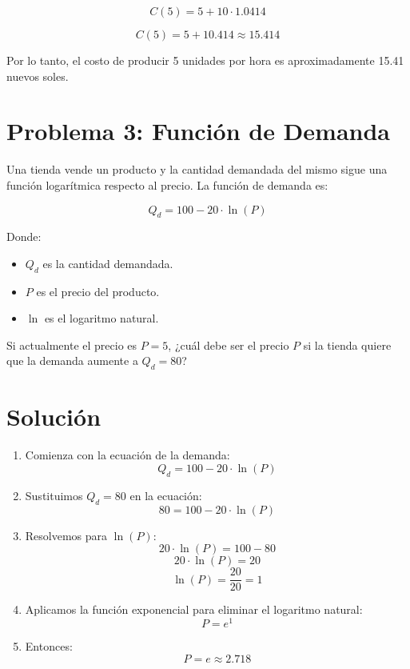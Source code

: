 \documentclass{article}
\begin{document}
\[
C(5) = 5 + 10 \cdot 1.0414
\]

\[
C(5) = 5 + 10.414 \approx 15.414
\]

Por lo tanto, el costo de producir 5 unidades por hora es aproximadamente 15.41 nuevos soles.

\section*{Problema 3: Función de Demanda}

Una tienda vende un producto y la cantidad demandada del mismo sigue una función logarítmica respecto al precio. La función de demanda es:

\[
Q_d = 100 - 20 \cdot \ln(P)
\]

Donde:
\begin{itemize}
    \item \(Q_d\) es la cantidad demandada.
    \item \(P\) es el precio del producto.
    \item \(\ln\) es el logaritmo natural.
\end{itemize}

Si actualmente el precio es \(P = 5\), ¿cuál debe ser el precio \(P\) si la tienda quiere que la demanda aumente a \(Q_d = 80\)?

\section*{Solución}

\begin{enumerate}
    \item Comienza con la ecuación de la demanda:
    \[
    Q_d = 100 - 20 \cdot \ln(P)
    \]

    \item Sustituimos \(Q_d = 80\) en la ecuación:
    \[
    80 = 100 - 20 \cdot \ln(P)
    \]

    \item Resolvemos para \(\ln(P)\):
    \[
    20 \cdot \ln(P) = 100 - 80
    \]
    \[
    20 \cdot \ln(P) = 20
    \]
    \[
    \ln(P) = \frac{20}{20} = 1
    \]

    \item Aplicamos la función exponencial para eliminar el logaritmo natural:
    \[
    P = e^1
    \]

    \item Entonces:
    \[
    P = e \approx 2.718
    \]

\end{enumerate}
\end{document}
